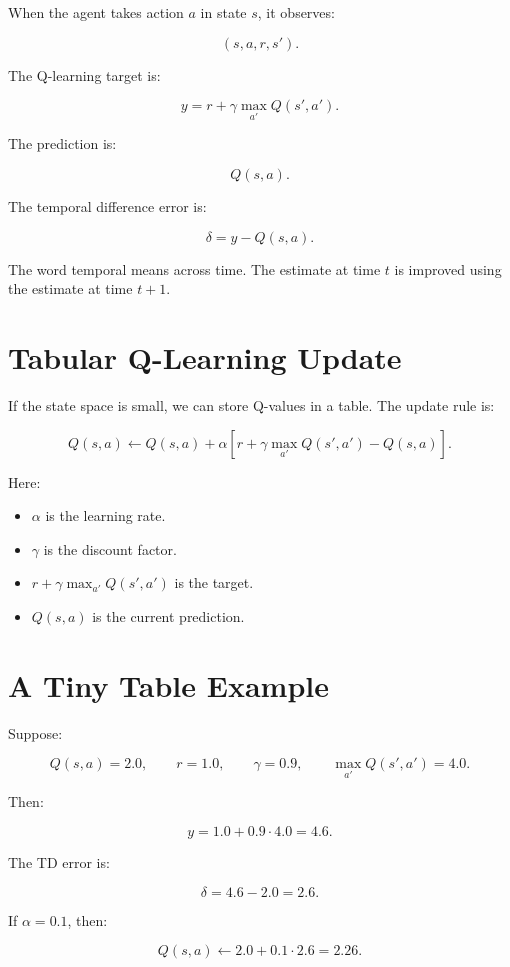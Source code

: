 \documentclass[11pt]{article}
\begin{document}
When the agent takes action $a$ in state $s$, it observes:

\[
(s, a, r, s').
\]

The Q-learning target is:

\[
y
=
r + \gamma \max_{a'} Q(s',a').
\]

The prediction is:

\[
Q(s,a).
\]

The temporal difference error is:

\[
\delta
=
y - Q(s,a).
\]

The word temporal means across time.
The estimate at time $t$ is improved using the estimate at time $t+1$.

\section{Tabular Q-Learning Update}

If the state space is small, we can store Q-values in a table.
The update rule is:

\[
\boxed{
Q(s,a)
\leftarrow
Q(s,a)
+
\alpha
\left[
r + \gamma \max_{a'}Q(s',a') - Q(s,a)
\right].
}
\]

Here:

\begin{itemize}[leftmargin=2em]
    \item $\alpha$ is the learning rate.
    \item $\gamma$ is the discount factor.
    \item $r + \gamma \max_{a'}Q(s',a')$ is the target.
    \item $Q(s,a)$ is the current prediction.
\end{itemize}

\section{A Tiny Table Example}

Suppose:

\[
Q(s,a) = 2.0,
\qquad
r = 1.0,
\qquad
\gamma = 0.9,
\qquad
\max_{a'}Q(s',a') = 4.0.
\]

Then:

\[
y = 1.0 + 0.9 \cdot 4.0 = 4.6.
\]

The TD error is:

\[
\delta = 4.6 - 2.0 = 2.6.
\]

If $\alpha = 0.1$, then:

\[
Q(s,a) \leftarrow 2.0 + 0.1 \cdot 2.6 = 2.26.
\]
\end{document}

